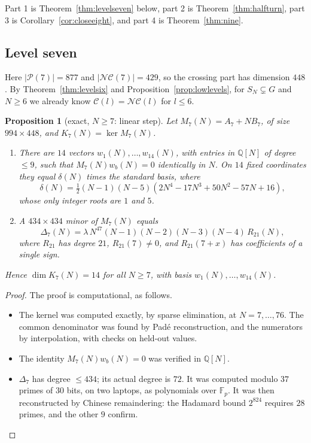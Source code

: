 \documentclass[11pt]{amsart}
\newtheorem{proposition}[theorem]{Proposition}
\theoremstyle{definition}
\theoremstyle{remark}
\theoremstyle{plain}
\numberwithin{equation}{section}
\numberwithin{table}{section}
\newcommand{\Q}{\mathbb Q}
\newcommand{\F}{\mathbb F}
\newcommand{\NC}{\mathcal{NC}}
\newcommand{\Pp}{\mathcal{P}}
\begin{document}
Part 1 is Theorem~\ref{thm:levelseven} below, part 2 is Theorem~\ref{thm:halfturn}, part 3 is Corollary~\ref{cor:closeeight}, and part 4 is Theorem~\ref{thm:nine}.

\subsection{Level seven}\label{sec:levelseven}

Here $|\Pp(7)|=877$ and $|\NC(7)|=429$, so the crossing part has dimension $448$. By Theorem~\ref{thm:levelsix} and Proposition~\ref{prop:lowlevels}, for $S_N\subsetneq G$ and $N\ge6$ we already know $\mathcal C(l)=\NC(l)$ for $l\le6$.

\begin{proposition}[exact, $N\ge7$: linear step]\label{prop:linseven}
Let $M_7(N)=A_7+NB_7$, of size $994\times448$, and $K_7(N)=\ker M_7(N)$.
\begin{enumerate}
\item There are $14$ vectors $w_1(N),\dots,w_{14}(N)$, with entries in $\Q[N]$ of degree $\le9$, such that $M_7(N)w_b(N)=0$ identically in $N$. On $14$ fixed coordinates they equal $\delta(N)$ times the standard basis, where
\[
\delta(N)=\tfrac12(N-1)(N-5)(2N^4-17N^3+50N^2-57N+16),
\]
whose only integer roots are $1$ and $5$.
\item A $434\times434$ minor of $M_7(N)$ equals
\[
\Delta_7(N)=\lambda\,N^{47}(N-1)(N-2)(N-3)(N-4)\,R_{21}(N),
\]
where $R_{21}$ has degree $21$, $R_{21}(7)\ne0$, and $R_{21}(7+x)$ has coefficients of a single sign.
\end{enumerate}
Hence $\dim K_7(N)=14$ for all $N\ge7$, with basis $w_1(N),\dots,w_{14}(N)$.
\end{proposition}

\begin{proof}
The proof is computational, as follows.
\begin{itemize}
\item The kernel was computed exactly, by sparse elimination, at $N=7,\dots,76$. The common denominator was found by Pad{\'e} reconstruction, and the numerators by interpolation, with checks on held-out values.
\item The identity $M_7(N)w_b(N)=0$ was verified in $\Q[N]$.
\item $\Delta_7$ has degree $\le434$; its actual degree is $72$. It was computed modulo $37$ primes of $30$ bits, on two laptops, as polynomials over $\F_p$. It was then reconstructed by Chinese remaindering: the Hadamard bound $2^{824}$ requires $28$ primes, and the other $9$ confirm. \qedhere
\end{itemize}
\end{proof}
\end{document}
